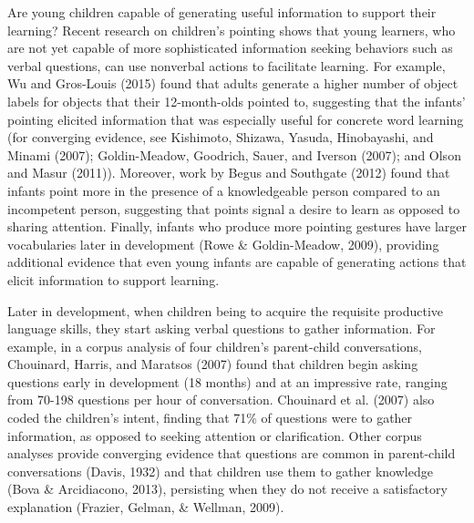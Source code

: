 \documentclass[english,floatsintext,man]{apa6}
\theoremstyle{definition}
\theoremstyle{definition}
\theoremstyle{definition}
\theoremstyle{remark}
\begin{document}
Are young children capable of generating useful information to support
their learning? Recent research on children's pointing shows that young
learners, who are not yet capable of more sophisticated information
seeking behaviors such as verbal questions, can use nonverbal actions to
facilitate learning. For example, Wu and Gros-Louis (2015) found that
adults generate a higher number of object labels for objects that their
12-month-olds pointed to, suggesting that the infants' pointing elicited
information that was especially useful for concrete word learning (for
converging evidence, see Kishimoto, Shizawa, Yasuda, Hinobayashi, and
Minami (2007); Goldin-Meadow, Goodrich, Sauer, and Iverson (2007); and
Olson and Masur (2011)). Moreover, work by Begus and Southgate (2012)
found that infants point more in the presence of a knowledgeable person
compared to an incompetent person, suggesting that points signal a
desire to learn as opposed to sharing attention. Finally, infants who
produce more pointing gestures have larger vocabularies later in
development (Rowe \& Goldin-Meadow, 2009), providing additional evidence
that even young infants are capable of generating actions that elicit
information to support learning.

Later in development, when children being to acquire the requisite
productive language skills, they start asking verbal questions to gather
information. For example, in a corpus analysis of four children's
parent-child conversations, Chouinard, Harris, and Maratsos (2007) found
that children begin asking questions early in development (18 months)
and at an impressive rate, ranging from 70-198 questions per hour of
conversation. Chouinard et al. (2007) also coded the children's intent,
finding that 71\% of questions were to gather information, as opposed to
seeking attention or clarification. Other corpus analyses provide
converging evidence that questions are common in parent-child
conversations (Davis, 1932) and that children use them to gather
knowledge (Bova \& Arcidiacono, 2013), persisting when they do not
receive a satisfactory explanation (Frazier, Gelman, \& Wellman, 2009).
\end{document}
